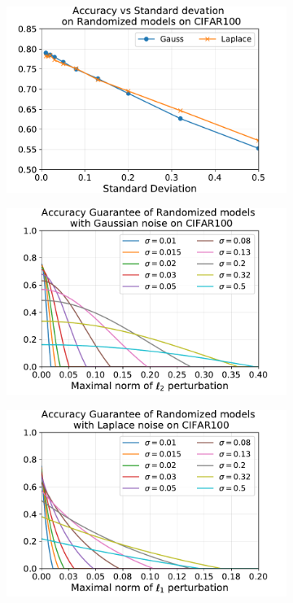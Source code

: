 \begin{figure}[htb]
  \centering
  \begin{subfigure}[t]{0.31\textwidth}
    \centering
    \includegraphics[scale=0.32]{figures/appendix3/acc_sd_CIFAR100.pdf}
    \caption{}
    \label{figure:ap3-acc_sd_CIFAR100-appendix}
  \end{subfigure}
  \begin{subfigure}[t]{0.31\textwidth}
    \centering
    \includegraphics[scale=0.32]{figures/appendix3/gauss_certif_CIFAR100.pdf}
    \caption{}
    \label{figure:ap3-gauss_certif_CIFAR100-appendix}
  \end{subfigure}
  \begin{subfigure}[t]{0.31\textwidth}
    \centering
    \includegraphics[scale=0.32]{figures/appendix3/laplace_certif_CIFAR100.pdf}

\end{subfigure}
\end{figure}
